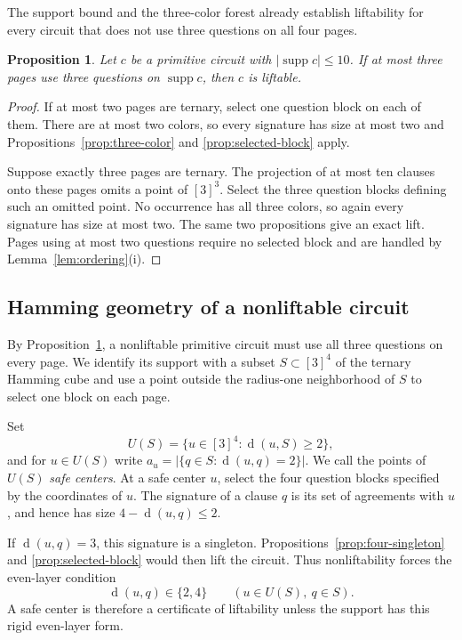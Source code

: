 \documentclass[11pt]{article}
\newtheorem{proposition}[theorem]{Proposition}
\theoremstyle{definition}
\theoremstyle{remark}
\newcommand{\supp}{\operatorname{supp}}
\newcommand{\dist}{\operatorname{d}}
\newcommand{\card}[1]{\lvert #1\rvert}
\numberwithin{equation}{section}
\begin{document}
The support bound and the three-color forest already establish liftability
for every circuit that does not use three questions on all four pages.

\begin{proposition}
\label{prop:four-ternary-reduction}
Let \(c\) be a primitive circuit with \(\card{\supp c}\leq10\).  If at most
three pages use three questions on \(\supp c\), then \(c\) is liftable.
\end{proposition}

\begin{proof}
If at most two pages are ternary, select one question block on each of them.
There are at most two colors, so every signature has size at most two and
Propositions~\ref{prop:three-color} and \ref{prop:selected-block} apply.

Suppose exactly three pages are ternary.  The projection of at most ten
clauses onto these pages omits a point of \([3]^3\).  Select the three
question blocks defining such an omitted point.  No occurrence has all three
colors, so again every signature has size at most two.  The same two
propositions give an exact lift.  Pages using at most two questions require no
selected block and are handled by Lemma~\ref{lem:ordering}(i).
\end{proof}

\subsection{Hamming geometry of a nonliftable circuit}\label{sec:safe}

By Proposition~\ref{prop:four-ternary-reduction}, a nonliftable primitive
circuit must use all three questions on every page.  We identify its support
with a subset \(S\subset[3]^4\) of the ternary Hamming cube and use a point
outside the radius-one neighborhood of \(S\) to select one block on each
page.

Set
\[
 U(S)=\{u\in[3]^4:\dist(u,S)\geq2\},
\]
and for \(u\in U(S)\) write
\(a_u=\lvert\{q\in S:\dist(u,q)=2\}\rvert\).  We call the points of
\(U(S)\) \emph{safe centers}.  At a safe center \(u\), select the four
question blocks specified by the coordinates of \(u\).  The signature of a
clause \(q\) is its set of agreements with \(u\), and hence has size
\(4-\dist(u,q)\leq2\).

If \(\dist(u,q)=3\), this signature is a singleton.
Propositions~\ref{prop:four-singleton} and \ref{prop:selected-block} would
then lift the circuit.  Thus nonliftability forces the even-layer condition
\begin{equation}\label{eq:hard-geometry-main}
  \dist(u,q)\in\{2,4\}
  \qquad(u\in U(S),\ q\in S).
\end{equation}
A safe center is therefore a certificate of liftability unless the support
has this rigid even-layer form.
\end{document}
